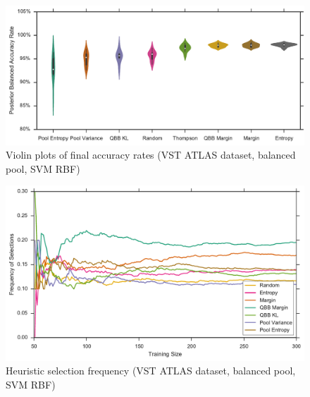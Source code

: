 \begin{figure}[p]
	\centering
	\includegraphics[width=\textwidth]{figures/5_active/vstatlas_br_ind_violin}
	\caption[Violin plots of final accuracy rates (VST ATLAS, balanced, SVM RBF)]{
		Violin plots of final accuracy rates (VST ATLAS dataset, balanced pool, SVM RBF)}
	\label{fig:vstatlas_br_ind_violin}
\end{figure}

\begin{figure}[p]
	\centering
	\includegraphics[width=\textwidth]{figures/5_thompson/vstatlas_br_frequencies}
	\caption[Heuristic selection frequency (VST ATLAS, balanced, SVM RBF)]{
		Heuristic selection frequency (VST ATLAS dataset, balanced pool, SVM RBF)}
	\label{fig:vstatlas_br_frequencies}
\end{figure}

